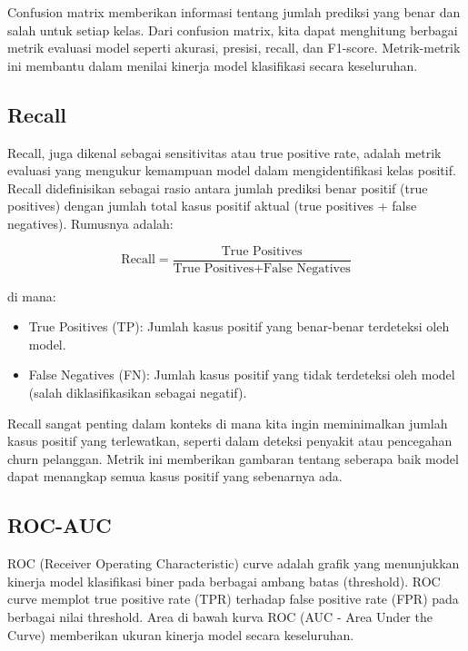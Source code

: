 Confusion matrix memberikan informasi tentang jumlah prediksi yang benar dan salah untuk setiap kelas. Dari confusion matrix, kita dapat menghitung berbagai metrik evaluasi model seperti akurasi, presisi, recall, dan F1-score. Metrik-metrik ini membantu dalam menilai kinerja model klasifikasi secara keseluruhan.

\subsection{Recall}
Recall, juga dikenal sebagai sensitivitas atau true positive rate, adalah metrik evaluasi yang mengukur kemampuan model dalam mengidentifikasi kelas positif. Recall didefinisikan sebagai rasio antara jumlah prediksi benar positif (true positives) dengan jumlah total kasus positif aktual (true positives + false negatives). Rumusnya adalah:

\begin{equation}
    \text{Recall} = \frac{\text{True Positives}}{\text{True Positives} + \text{False Negatives}}
\end{equation}

di mana:
\begin{itemize}
    \item True Positives (TP): Jumlah kasus positif yang benar-benar terdeteksi oleh model.
    \item False Negatives (FN): Jumlah kasus positif yang tidak terdeteksi oleh model (salah diklasifikasikan sebagai negatif).
\end{itemize}

Recall sangat penting dalam konteks di mana kita ingin meminimalkan jumlah kasus positif yang terlewatkan, seperti dalam deteksi penyakit atau pencegahan churn pelanggan. Metrik ini memberikan gambaran tentang seberapa baik model dapat menangkap semua kasus positif yang sebenarnya ada.

\subsection{ROC-AUC}
ROC (Receiver Operating Characteristic) curve adalah grafik yang menunjukkan kinerja model klasifikasi biner pada berbagai ambang batas (threshold). ROC curve memplot true positive rate (TPR) terhadap false positive rate (FPR) pada berbagai nilai threshold. Area di bawah kurva ROC (AUC - Area Under the Curve) memberikan ukuran kinerja model secara keseluruhan.

